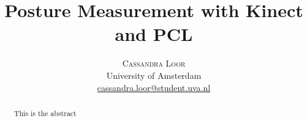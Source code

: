 \documentclass[twoside]{article}
\title{\vspace{-15mm}\fontsize{24pt}{10pt}\selectfont\textbf{Posture Measurement with Kinect and PCL}}
\author{
\large
\textsc{Cassandra Loor}\\[2mm]
\normalsize University of Amsterdam \\
\normalsize \href{mailto:john@smith.com}{cassandra.loor@student.uva.nl} 
\vspace{-5mm}
}
\date{}
\begin{document}
\maketitle %

\thispagestyle{fancy} %


\begin{abstract}

\noindent This is the abstract

\end{abstract}

\end{document}
